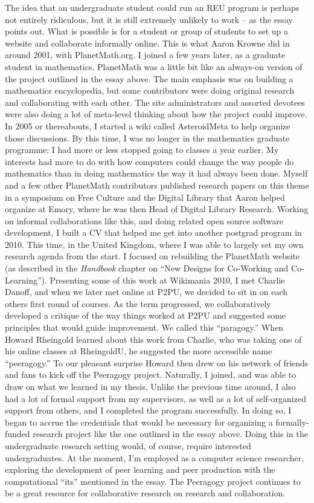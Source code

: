 The idea that an undergraduate student could run an REU program is
perhaps not entirely ridiculous, but it is still extremely unlikely to
work -- as the essay points out.  What is possible is for a student or
group of students to set up a website and collaborate informally
online.  This is what Aaron Krowne did in around 2001, with
PlanetMath.org.  I joined a few years later, as a graduate student in
mathematics.  PlanetMath was a little bit like an always-on version of
the project outlined in the essay above.  The main emphasis was on
building a mathematics encyclopedia, but some contributors were doing
original research and collaborating with each other.  The site
administrators and assorted devotees were also doing a lot of
meta-level thinking about how the project could improve.  In 2005 or
thereabouts, I started a wiki called AsteroidMeta to help organize
those discussions.  By this time, I was no longer in the mathematics
graduate programme: I had more or less stopped going to classes a year
earlier.  My interests had more to do with how computers could change
the way people do mathematics than in doing mathematics the way it had
always been done.  Myself and a few other PlanetMath contributors
published research papers on this theme in a symposium on Free Culture
and the Digital Library that Aaron helped organize at Emory, where he
was then Head of Digital Library Research.  Working on informal
collaborations like this, and doing related open source software
development, I built a CV that helped me get into another postgrad
program in 2010.  This time, in the United Kingdom, where I was able
to largely set my own research agenda from the start.  I focused on
rebuilding the PlanetMath website (as described in the \emph{Handbook}
chapter on ``New Designs for Co-Working and Co-Learning'').
Presenting some of this work at Wikimania 2010, I met Charlie Danoff,
and when we later met online at P2PU, we decided to sit in on each
others first round of courses.  As the term progressed, we
collaboratively developed a critique of the way things worked at P2PU
and suggested some principles that would guide improvement.  We called
this ``paragogy.''  When Howard Rheingold learned about this work from
Charlie, who was taking one of his online classes at RheingoldU, he
suggested the more accessible name ``peeragogy.''  To our pleasant
surprise Howard then drew on his network of friends and fans to kick
off the Peeragogy project.  Naturally, I joined, and was able to draw
on what we learned in my thesis.  Unlike the previous time around, I
also had a lot of formal support from my supervisors, as well as a lot
of self-organized support from others, and I completed the program
successfully.  In doing so, I began to accrue the credentials that
would be necessary for organizing a formally-funded research project
like the one outlined in the essay above.  Doing this in the
undergraduate research setting would, of course, require interested
undergraduates.  At the moment, I'm employed as a computer science
researcher, exploring the development of peer learning and peer
production with the computational ``its'' mentioned in the essay.  The
Peeragogy project continues to be a great resource for collaborative
research on research and collaboration.
